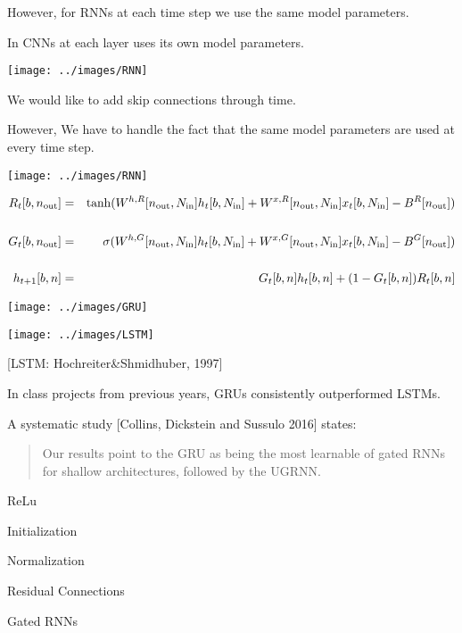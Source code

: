 {\vfill
However, for RNNs {\color{red} at each time step we use the same model parameters.}

\vfill
In CNNs {\color{red} at each layer uses its own model parameters.}


\centerline{\texttt{[image: ../images/RNN]}}

\vfill
We would like to add {\color{red} skip connections through time}.

\vfill
However, We have to handle the fact that the same model parameters are used at every time step.

\centerline{\texttt{[image: ../images/RNN]}}

{\huge
\vfill
\begin{eqnarray*}
R_t[b,n_{\mathrm{out}}] & = & \mathrm{tanh}(W^{h,R}[n_{\mathrm{out}},N_{\mathrm{in}}]h_t[b,N_{\mathrm{in}}] + W^{x,R}[n_{\mathrm{out}},N_{\mathrm{in}}]x_t[b,N_{\mathrm{in}}] - B^R[n_{\mathrm{out}}]) \\
\\
G_t[b,n_{\mathrm{out}}] & = & \;\;\;\;\sigma(W^{h,G}[n_{\mathrm{out}},N_{\mathrm{in}}]h_t[b,N_{\mathrm{in}}] + W^{x,G}[n_{\mathrm{out}},N_{\mathrm{in}}]x_t[b,N_{\mathrm{in}}] - B^G[n_{\mathrm{out}}]) \\
\\
h_{t+1}[b,n] & = & G_t[b,n]h_t[b,n] + (1-G_t[b,n])R_t[b,n]
\end{eqnarray*}
}


\centerline{\texttt{[image: ../images/GRU]}}

\centerline{\texttt{[image: ../images/LSTM]}}

\centerline{\Large [LSTM: Hochreiter\&Shmidhuber, 1997]}


\vfill
In class projects from previous years, GRUs consistently outperformed LSTMs.

\vfill
A systematic study [Collins, Dickstein and Sussulo 2016] states:

\begin{quotation}
  Our results point to the GRU as being the most learnable of gated RNNs for shallow architectures, followed by the UGRNN.
\end{quotation}

  \centerline{ReLu}
  \vfill
  \centerline{Initialization}
  \vfill
  \centerline{Normalization}
  \vfill
  \centerline{Residual Connections}
  \vfill
  \centerline{Gated RNNs}


}

